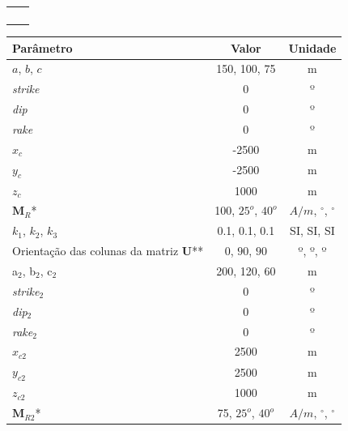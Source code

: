 \begin{table}[h!]
	\begin{center}
		\begin{tabular}{lc}
			
			&  \\
			&  \\
			&  \\
			&  \\
		\end{tabular}
	\end{center}
\end{table}

\begin{table}[h!]
	\begin{center}
		\begin{tabular}{|l|c|c|}
			\hline
			\textbf{Parâmetro}  & \textbf{Valor}  & \textbf{Unidade}\\
			\hline 
			$a$, $b$, $c$   & 150, 100, 75 & m\\
			\hline
			\textit{strike}   & $0$ & º\\
			\hline
			\textit{dip}    & $0$ & º\\
			\hline
			\textit{rake}   & $0$  & º\\
			\hline
			$x_c$   & -2500  & m\\
			\hline          
			$y_c$   & -2500  & m\\
			\hline                
			$z_c$  & 1000  & m\\
			\hline
			$\mathbf{M}_{R}$*  & 100, $25^o$, $40^o$  & $A/m$, $^{\circ}$, $^{\circ}$\\
			\hline
			$k_1$, $k_2$, $k_3$   & 0.1, 0.1, 0.1  & SI, SI, SI\\
			\hline
			Orientação das colunas da matriz $\mathbf{U}$**   & $0$, $90$, $90$  & º, º, º\\
			\hline 
			a$_2$, b$_2$, c$_2$   & 200, 120, 60 & m\\
			\hline
			\textit{strike}$_2$   & $0$ & º\\
			\hline
			\textit{dip}$_2$    & $0$ & º\\
			\hline
			\textit{rake}$_2$   & $0$  & º\\
			\hline
			$x_{c2}$   & 2500  & m\\
			\hline          
			$y_{c2}$   & 2500  & m\\
			\hline                
			$z_{c2}$   & 1000  & m\\
			\hline
			$\mathbf{M}_{R2}$*  & 75, $25^o$, $40^o$  & $A/m$, $^{\circ}$, $^{\circ}$\\

\end{tabular}
\end{center}
\end{table}
